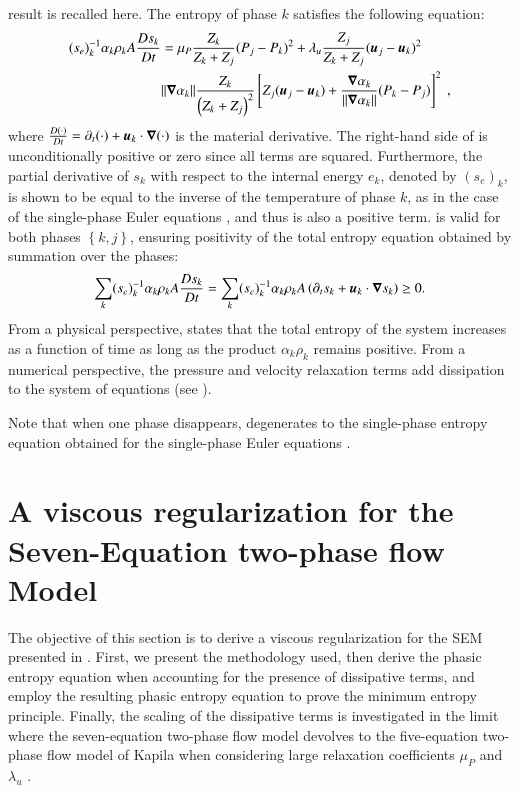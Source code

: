 result is recalled here. 
The entropy of phase $k$ satisfies the following equation:
%
\begin{align} \label{eq:ent-eqn-7-eqn-model}
(s_{e})_k^{-1} \alpha_k \rho_k A \frac{Ds_k}{Dt} &= \mu_P \frac{Z_k}{Z_k+Z_j} (P_j - P_k)^2 + \lambda_u \frac{Z_j}{Z_k+Z_j} (\boldsymbol u_j -\boldsymbol u_k)^2 \nonumber
\\
& \| \boldsymbol\nabla \alpha_k \| \frac{Z_k}{\left( Z_k+Z_j \right)^2} \left[ Z_j (\boldsymbol u_j-\boldsymbol u_k)+\frac{\boldsymbol\nabla \alpha_k}{\| \boldsymbol\nabla \alpha_k \|}(P_k-P_j)\right]^2 \ ,
\end{align}
%
where $\frac{D(\cdot) }{Dt} = \partial_t (\cdot) + \boldsymbol u_k \cdot \boldsymbol\nabla (\cdot)$ is the material derivative.
The right-hand side of  is unconditionally positive or zero since all terms are squared. Furthermore, 
the partial derivative of $s_k$ with respect to the internal energy $e_k$, denoted by $(s_e)_k$, is shown to be equal to the inverse of the temperature 
of phase $k$, as in the case of the single-phase Euler equations \cite{jlg_VR_SIAM_2004,Marco_dissertation}, and thus is also a positive term.
 is valid for both phases $\left\{k, j\right\}$, ensuring positivity of the total entropy equation obtained by summation over the phases:
%
\begin{equation}\label{eq:tot-ent-res-sct4}
\sum_k (s_{e})_k^{-1} \alpha_k \rho_k A \frac{Ds_k}{Dt} = \sum_k (s_{e})_k^{-1} \alpha_k \rho_k A \left( \partial_t s_k + \boldsymbol u_k \cdot \boldsymbol\nabla s_k \right) \geq 0  .
\end{equation}
%
From a physical perspective,  states that the total entropy of the system increases as a 
function of time as long as the product $\alpha_k \rho_k$ remains positive. From a numerical perspective, 
the pressure and velocity relaxation terms add dissipation to the system of equations (see ).

Note that when one phase disappears,  degenerates to the single-phase entropy equation obtained for the single-phase 
Euler equations \cite{SEM,Marco_dissertation}.

\section{A viscous regularization for the Seven-Equation two-phase flow Model}\label{sec:visc-regu}
%
The objective of this section is to derive a viscous regularization for the SEM presented in . First, we present the methodology used, 
then derive the phasic entropy equation when accounting for the presence of dissipative terms, and employ the resulting phasic entropy equation to prove 
the minimum entropy principle. Finally, the scaling of the dissipative terms is investigated in the limit where the seven-equation two-phase flow model 
devolves to the five-equation two-phase flow model of Kapila \cite{Kapila_2001} when considering large relaxation coefficients $\mu_P$ and $\lambda_u$ \cite{dellacherie}.
%
